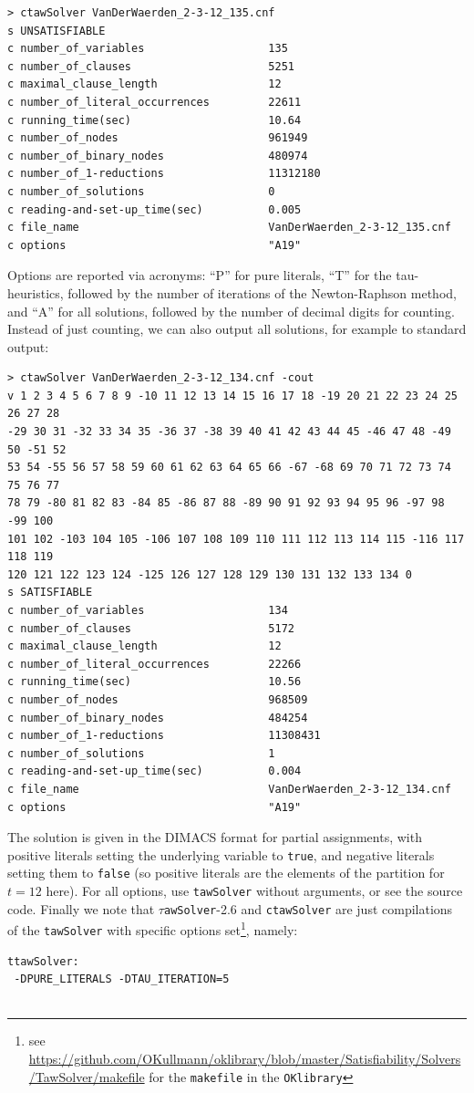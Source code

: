 \documentclass[final,3p,times]{elsarticle}
\theoremstyle{definition}
\newcommand{\OKlibrary}{\texttt{OKlibrary}}
\newcommand{\tawsolver}{\texttt{tawSolver}}
\newcommand{\ttawsolver}{$\tau$\texttt{awSolver}-2.6}
\begin{document}
\begin{appendix}
\begin{verbatim}
> ctawSolver VanDerWaerden_2-3-12_135.cnf
s UNSATISFIABLE
c number_of_variables                   135
c number_of_clauses                     5251
c maximal_clause_length                 12
c number_of_literal_occurrences         22611
c running_time(sec)                     10.64
c number_of_nodes                       961949
c number_of_binary_nodes                480974
c number_of_1-reductions                11312180
c number_of_solutions                   0
c reading-and-set-up_time(sec)          0.005
c file_name                             VanDerWaerden_2-3-12_135.cnf
c options                               "A19"
\end{verbatim}
Options are reported via acronyms: ``P'' for pure literals, ``T'' for the tau-heuristics, followed by the number of iterations of the Newton-Raphson method, and ``A'' for all solutions, followed by the number of decimal digits for counting. Instead of just counting, we can also output all solutions, for example to standard output:
\begin{verbatim}
> ctawSolver VanDerWaerden_2-3-12_134.cnf -cout
v 1 2 3 4 5 6 7 8 9 -10 11 12 13 14 15 16 17 18 -19 20 21 22 23 24 25 26 27 28
-29 30 31 -32 33 34 35 -36 37 -38 39 40 41 42 43 44 45 -46 47 48 -49 50 -51 52
53 54 -55 56 57 58 59 60 61 62 63 64 65 66 -67 -68 69 70 71 72 73 74 75 76 77
78 79 -80 81 82 83 -84 85 -86 87 88 -89 90 91 92 93 94 95 96 -97 98 -99 100
101 102 -103 104 105 -106 107 108 109 110 111 112 113 114 115 -116 117 118 119
120 121 122 123 124 -125 126 127 128 129 130 131 132 133 134 0
s SATISFIABLE
c number_of_variables                   134
c number_of_clauses                     5172
c maximal_clause_length                 12
c number_of_literal_occurrences         22266
c running_time(sec)                     10.56
c number_of_nodes                       968509
c number_of_binary_nodes                484254
c number_of_1-reductions                11308431
c number_of_solutions                   1
c reading-and-set-up_time(sec)          0.004
c file_name                             VanDerWaerden_2-3-12_134.cnf
c options                               "A19"
\end{verbatim}
The solution is given in the DIMACS format for partial assignments, with positive literals setting the underlying variable to \texttt{true}, and negative literals setting them to \texttt{false} (so positive literals are the elements of the partition for $t=12$ here). For all options, use \texttt{tawSolver} without arguments, or see the source code. Finally we note that \ttawsolver{} and \texttt{ctawSolver} are just compilations of the \tawsolver{} with specific options set\footnote{see \url{https://github.com/OKullmann/oklibrary/blob/master/Satisfiability/Solvers/TawSolver/makefile} for the \texttt{makefile} in the \OKlibrary}, namely:
\begin{verbatim}
ttawSolver:
 -DPURE_LITERALS -DTAU_ITERATION=5


\end{verbatim}
\end{appendix}
\end{document}
